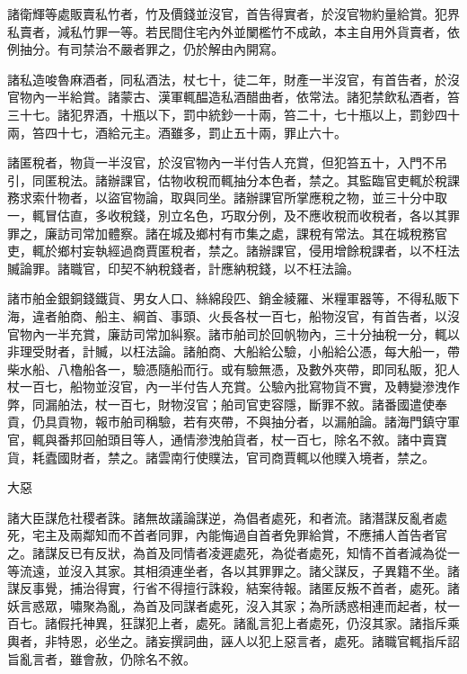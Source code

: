 \begin{pinyinscope}
 諸衛輝等處販賣私竹者，竹及價錢並沒官，首告得實者，於沒官物約量給賞。犯界私賣者，減私竹罪一等。若民間住宅內外並闌檻竹不成畝，本主自用外貨賣者，依例抽分。有司禁治不嚴者罪之，仍於解由內開寫。



 諸私造唆魯麻酒者，同私酒法，杖七十，徒二年，財產一半沒官，有首告者，於沒官物內一半給賞。諸蒙古、漢軍輒醖造私酒醋曲者，依常法。諸犯禁飲私酒者，笞三十七。諸犯界酒，十瓶以下，罰中統鈔一十兩，笞二十，七十瓶以上，罰鈔四十兩，笞四十七，酒給元主。酒雖多，罰止五十兩，罪止六十。



 諸匿稅者，物貨一半沒官，於沒官物內一半付告人充賞，但犯笞五十，入門不吊引，同匿稅法。諸辦課官，估物收稅而輒抽分本色者，禁之。其監臨官吏輒於稅課務求索什物者，以盜官物論，取與同坐。諸辦課官所掌應稅之物，並三十分中取一，輒冒估直，多收稅錢，別立名色，巧取分例，及不應收稅而收稅者，各以其罪罪之，廉訪司常加體察。諸在城及鄉村有市集之處，課稅有常法。其在城稅務官吏，輒於鄉村妄執經過商賈匿稅者，禁之。諸辦課官，侵用增餘稅課者，以不枉法贓論罪。諸職官，印契不納稅錢者，計應納稅錢，以不枉法論。



 諸市舶金銀銅錢鐵貨、男女人口、絲綿段匹、銷金綾羅、米糧軍器等，不得私販下海，違者舶商、船主、綱首、事頭、火長各杖一百七，船物沒官，有首告者，以沒官物內一半充賞，廉訪司常加糾察。諸市舶司於回帆物內，三十分抽稅一分，輒以非理受財者，計贓，以枉法論。諸舶商、大船給公驗，小船給公憑，每大船一，帶柴水船、八櫓船各一，驗憑隨船而行。或有驗無憑，及數外夾帶，即同私販，犯人杖一百七，船物並沒官，內一半付告人充賞。公驗內批寫物貨不實，及轉變滲洩作弊，同漏舶法，杖一百七，財物沒官；舶司官吏容隱，斷罪不敘。諸番國遣使奉貢，仍具貢物，報市舶司稱驗，若有夾帶，不與抽分者，以漏舶論。諸海門鎮守軍官，輒與番邦回舶頭目等人，通情滲洩舶貨者，杖一百七，除名不敘。諸中賣寶貨，耗蠹國財者，禁之。諸雲南行使贌法，官司商賈輒以他贌入境者，禁之。



 大惡



 諸大臣謀危社稷者誅。諸無故議論謀逆，為倡者處死，和者流。諸潛謀反亂者處死，宅主及兩鄰知而不首者同罪，內能悔過自首者免罪給賞，不應捕人首告者官之。諸謀反已有反狀，為首及同情者凌遲處死，為從者處死，知情不首者減為從一等流遠，並沒入其家。其相須連坐者，各以其罪罪之。諸父謀反，子異籍不坐。諸謀反事覺，捕治得實，行省不得擅行誅殺，結案待報。諸匿反叛不首者，處死。諸妖言惑眾，嘯聚為亂，為首及同謀者處死，沒入其家；為所誘惑相連而起者，杖一百七。諸假托神異，狂謀犯上者，處死。諸亂言犯上者處死，仍沒其家。諸指斥乘輿者，非特恩，必坐之。諸妄撰詞曲，誣人以犯上惡言者，處死。諸職官輒指斥詔旨亂言者，雖會赦，仍除名不敘。




\end{pinyinscope}
